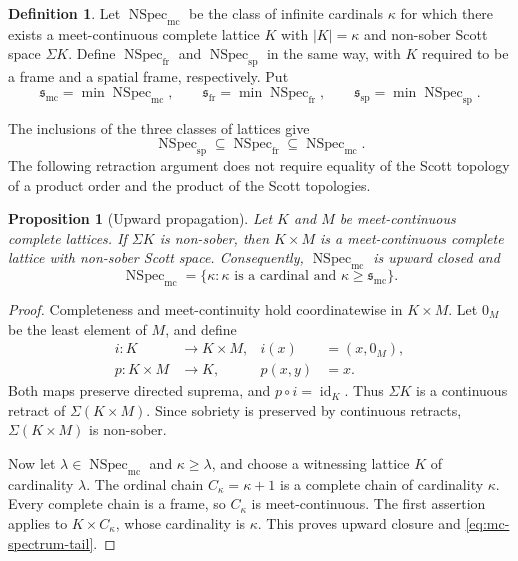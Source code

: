 \documentclass[preprint,11pt]{elsarticle}
\newtheorem{proposition}[theorem]{Proposition}
\theoremstyle{definition}
\newtheorem{definition}[theorem]{Definition}
\theoremstyle{remark}
\numberwithin{equation}{section}
\newcommand{\Sig}{\Sigma}
\newcommand{\Specmc}{\operatorname{NSpec}_{\mathrm{mc}}}
\newcommand{\Specfr}{\operatorname{NSpec}_{\mathrm{fr}}}
\newcommand{\Specsp}{\operatorname{NSpec}_{\mathrm{sp}}}
\newcommand{\smc}{\mathfrak{s}_{\mathrm{mc}}}
\newcommand{\sfr}{\mathfrak{s}_{\mathrm{fr}}}
\newcommand{\ssp}{\mathfrak{s}_{\mathrm{sp}}}
\begin{document}
\begin{definition}\label{def:mc-spectrum}
Let $\Specmc$ be the class of infinite cardinals $\kappa$ for which there exists a meet-continuous complete lattice $K$ with $|K|=\kappa$ and non-sober Scott space $\Sig K$. Define $\Specfr$ and $\Specsp$ in the same way, with $K$ required to be a frame and a spatial frame, respectively. Put
\[
 \smc=\min\Specmc,\qquad
 \sfr=\min\Specfr,\qquad
 \ssp=\min\Specsp.
\]
\end{definition}

The inclusions of the three classes of lattices give
\begin{equation}\label{eq:mc-spectrum-inclusions}
 \Specsp\subseteq\Specfr\subseteq\Specmc.
\end{equation}
The following retraction argument does not require equality of the Scott topology of a product order and the product of the Scott topologies.

\begin{proposition}[Upward propagation]\label{prop:mc-upward}
Let $K$ and $M$ be meet-continuous complete lattices. If $\Sig K$ is non-sober, then $K\times M$ is a meet-continuous complete lattice with non-sober Scott space. Consequently, $\Specmc$ is upward closed and
\begin{equation}\label{eq:mc-spectrum-tail}
 \Specmc=\{\kappa:\kappa\text{ is a cardinal and }\kappa\geq\smc\}.
\end{equation}
\end{proposition}
\begin{proof}
Completeness and meet-continuity hold coordinatewise in $K\times M$. Let $0_M$ be the least element of $M$, and define
\[
\begin{aligned}
 i:K&\longrightarrow K\times M,&i(x)&=(x,0_M),\\
 p:K\times M&\longrightarrow K,&p(x,y)&=x.
\end{aligned}
\]
Both maps preserve directed suprema, and $p\circ i=\operatorname{id}_K$. Thus $\Sig K$ is a continuous retract of $\Sig(K\times M)$. Since sobriety is preserved by continuous retracts, $\Sig(K\times M)$ is non-sober.

Now let $\lambda\in\Specmc$ and $\kappa\geq\lambda$, and choose a witnessing lattice $K$ of cardinality $\lambda$. The ordinal chain $C_\kappa=\kappa+1$ is a complete chain of cardinality $\kappa$. Every complete chain is a frame, so $C_\kappa$ is meet-continuous. The first assertion applies to $K\times C_\kappa$, whose cardinality is $\kappa$. This proves upward closure and \eqref{eq:mc-spectrum-tail}.
\end{proof}
\end{document}
